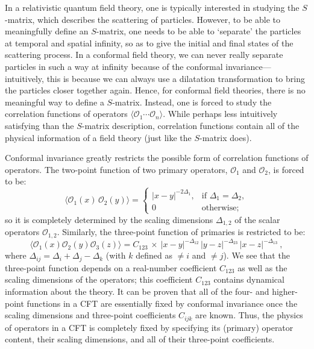 \documentclass[12pt]{article}
\def\be{\begin{equation}}
\def\ee{\end{equation}}
\renewcommand{\^}[1]{\hat{#1}}
\begin{document}
In a relativistic quantum field theory, one is typically interested in studying the $S$-matrix, which describes the scattering of particles. However, to be able to meaningfully define an $S$-matrix, one needs to be able to `separate' the particles at temporal and spatial infinity, so as to give the initial and final states of the scattering process. In a conformal field theory, we can never really separate particles in such a way at infinity because of the conformal invariance---intuitively, this is because we can always use a dilatation transformation to bring the particles closer together again. Hence, for conformal field theories, there is no meaningful way to define a $S$-matrix. Instead, one is forced to study the correlation functions of operators $\langle \mathcal{O}_1\cdots \mathcal{O}_n\rangle$. While perhaps less intuitively satisfying than the $S$-matrix description, correlation functions contain all of the physical information of a field theory (just like the $S$-matrix does).



Conformal invariance greatly restricts the possible form of correlation functions of operators. The two-point function of two primary operators, $\mathcal{O}_1$ and $\mathcal{O}_2$, is forced to be:
\be 
\langle \mathcal{O}_1(x)\, \mathcal{O}_2(y)\rangle = \begin{cases} |x-y|^{-2\Delta_1}, & \text{if $\Delta_1=\Delta_2$},\\
                                                         0 &  \text{otherwise;}
                                                       \end{cases}
\ee
so it is completely determined by the scaling dimensions $\Delta_{1,2}$ of the scalar operators $\mathcal{O}_{1,2}$. Similarly, the three-point function of primaries is restricted to be:
\be \langle \mathcal{O}_1(x) \mathcal{O}_2(y) \mathcal{O}_3(z)\rangle = C_{123}\,\times~|x-y|^{-\Delta_{12}}\, |y-z|^{-\Delta_{23}}\, |x-z|^{-\Delta_{13}}~,\ee
where $\Delta_{ij} = \Delta_i + \Delta_j - \Delta_k$ (with $k$ defined as $\neq i$ and $\neq j$). We see that the three-point function depends on a real-number coefficient $C_{123}$ as well as the scaling dimensions of the operators; this coefficient $C_{123}$ contains dynamical information about the theory. It can be proven that all of the four- and higher-point functions in a CFT are essentially fixed by conformal invariance once the scaling dimensions and three-point coefficients $C_{ijk}$ are known. Thus, the physics of operators in a CFT is completely fixed by specifying its (primary) operator content, their scaling dimensions, and all of their three-point coefficients.
\end{document}
